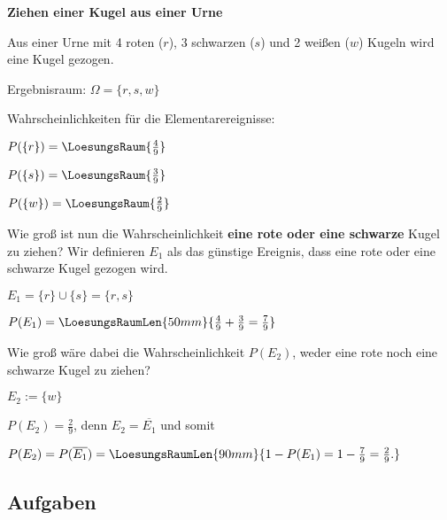 
\begin{beispiel}{}{}\textbf{Ziehen einer Kugel aus einer Urne}

Aus einer Urne mit 4 roten ($r$), 3 schwarzen ($s$) und 2 weißen ($w$) Kugeln wird eine Kugel gezogen.

Ergebnisraum: $\Omega = \{r, s, w\}$


Wahrscheinlichkeiten für die Elementarereignisse:

\noTRAINER{\leserluft\leserluft\leserluft}
$P(\{r\}) = \LoesungsRaum{\frac49}$

\noTRAINER{\leserluft\leserluft\leserluft}
$P(\{s\}) = \LoesungsRaum{\frac39}$

\noTRAINER{\leserluft\leserluft\leserluft}
$P(\{w\}) = \LoesungsRaum{\frac29}$

Wie groß ist nun die Wahrscheinlichkeit \textbf{eine rote oder eine schwarze} Kugel zu ziehen?
Wir definieren $E_1$ als das günstige Ereignis, dass eine rote oder eine schwarze Kugel gezogen wird.

$E_1 = \{r\} \cup \{s\} = \{r,s\}$

\noTRAINER{\leserluft\leserluft\leserluft}
$P(E_1) = \LoesungsRaumLen{50mm}{\frac49 + \frac39 = \frac79}$


Wie groß wäre dabei die Wahrscheinlichkeit $P(E_2)$, weder eine rote noch eine schwarze Kugel zu ziehen?

$E_2 := \{w\}$

$P(E_2) = \frac29$, denn $E_2 = \overline{E_1}$ und somit

\noTRAINER{\leserluft\leserluft}
$P(E_2) = P(\overline{E_1}) = \LoesungsRaumLen{90mm}{1 - P(E_1) = 1 - \frac79 = \frac29 . }$

\end{beispiel}
\newpage

\subsection*{Aufgaben}



\newpage



